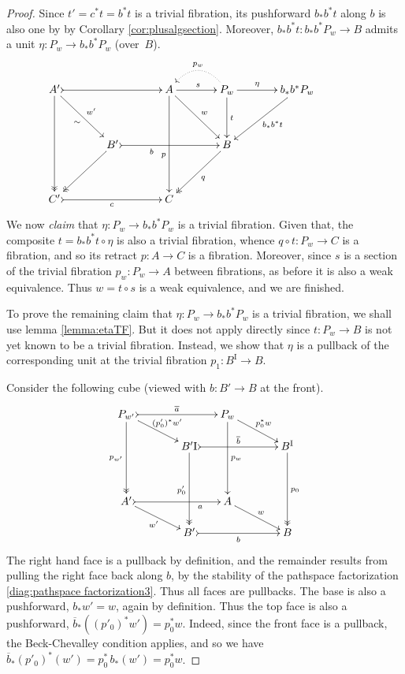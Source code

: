 \documentclass[12pt]{article}
\newcommand{\ra}{\ensuremath{\rightarrow}}
\newcommand{\I}{\ensuremath{\mathrm{I}}}
\theoremstyle{remark}
\theoremstyle{definition}
\begin{document}
\begin{proof}
Since $t' = c^*t = b^*t$ is a trivial fibration, its pushforward $b_*b^*t$ along $b$ is also one by by Corollary \ref{cor:plusalgsection}.  Moreover, $b_*b^*t : b_*b^*P_w \ra B$ admits a unit $\eta : P_w \ra  b_*b^*P_w$ (over~$B$).  
\begin{equation}\label{diag:EEPfactored3}
\xymatrix@=1.5em{
A' \ar@{->>}[dddd] \ar[rrdd]_{\sim}^{w'} \ar@{>->}[rrrr] && && A \ar[dddd]_>>>>>>>>>>>>p \ar[rrdd]^{w} \ar[rr]^s && \ar@{.>}@/_1.5pc/[ll]_{p_w} P_w \ar[dd]^t \ar[rr]^-\eta && b_*b^*P_w \ar[lldd]^{b_*b^*t}\\
\\
&& B' \ar@{->>}[lldd] \ar@{>->}[rrrr]_<<<<<<<<<<b  &&&& B \ar@{->>}[lldd]^q &&&& \\
\\
C' \ar@{>->}[rrrr]_c &&&& C &&&&
}
\end{equation}
We now \emph{claim} that $\eta : P_w \ra  b_*b^*P_w$ is a trivial fibration.  Given that,  the composite $t = b_*b^*t \circ \eta$ is also a trivial fibration, whence $q\circ t : P_w \ra C$ is a fibration, and so its retract $p:A\ra C$ is a fibration.  Moreover, since $s$ is a section of the trivial fibration $p_w: P_w\ra A$ between fibrations, as before it is also a weak equivalence. Thus $w=t\circ s$ is a weak equivalence, and we are finished. 

To prove the remaining claim that $\eta : P_w \ra  b_*b^*P_w$ is a trivial fibration, we shall use lemma \ref{lemma:etaTF}.  But it does not apply directly since $t : P_w \ra B$ is not yet known to be a trivial fibration.  Instead, we show that $\eta$ is a pullback of the corresponding unit at the trivial fibration $p_1 : B^\I \ra B$.

Consider the following cube (viewed with $b:B'\ra B$ at the front).
\begin{equation}\label{diag:ppcube}
\xymatrix@=1.5em{
P_{w'} \ar@{->>}[ddd]_{p_{w'}} \ar[rrd]^{(p'_0)^*w'} \ar@{>->}[rrr]^{\overline{a}}
		&&& P_w \ar[ddd]^{p_w} \ar[rrd]^{p_0^*w} &&\\
&& B'^\I \ar@{->>}[ddd]_{p'_0} \ar@{>->}[rrr]^{\overline{b}}  
		&&& B^\I \ar@{->>}[ddd]^{p_0} \\
\\
A' \ar@{>->}[rrr]_>>>>>>>a  \ar[rrd]_{w'}
		&&& A \ar[rrd]^{w} &&\\
&& B'\ar@{>->}[rrr]_b &&& B
}
\end{equation}
The right hand face is a pullback by definition, and the remainder results from pulling the right face back along $b$, by the stability of the pathspace factorization \eqref{diag:pathspace factorization3}. Thus all faces are pullbacks.  The base is also a pushforward, $b_*w'=w$, again by definition.  Thus the top face is also a pushforward, $\overline{b}_*((p'_0)^*w')=p_0^*w$. Indeed, since the front face is a pullback, the Beck-Chevalley condition applies, and so we have $\overline{b}_*(p'_0)^*(w') = p_0^*\,b_*(w') = p_0^*w$.


\end{proof}
\end{document}
